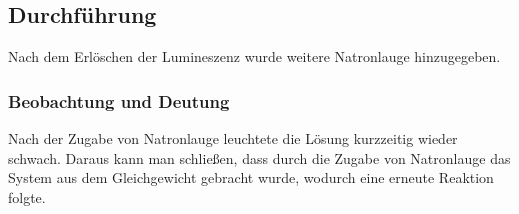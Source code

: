 \subsection{Durchf\"uhrung}

Nach dem Erl\"oschen der Lumineszenz wurde weitere Natronlauge hinzugegeben.
\subsubsection{Beobachtung und Deutung}
Nach der Zugabe von Natronlauge leuchtete die L\"osung kurzzeitig wieder schwach.
Daraus kann man schließen, dass durch die Zugabe von Natronlauge das System aus dem Gleichgewicht gebracht wurde, wodurch eine erneute Reaktion folgte.
